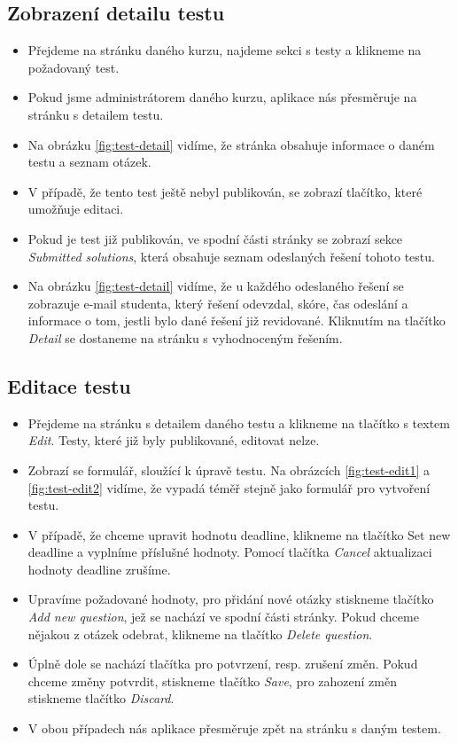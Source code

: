 \subsection{Zobrazení detailu testu}
\begin{itemize}
	\item Přejdeme na stránku daného kurzu, najdeme sekci s testy a klikneme na požadovaný test.
	\item Pokud jsme administrátorem daného kurzu, aplikace nás přesměruje na stránku s detailem testu.
	\item Na obrázku \ref{fig:test-detail} vidíme, že stránka obsahuje informace o daném testu a seznam otázek.
	\item V případě, že tento test ještě nebyl publikován, se zobrazí tlačítko, které umožňuje editaci.
	\item Pokud je test již publikován, ve spodní části stránky se zobrazí sekce \textit{Submitted solutions}, která obsahuje seznam odeslaných řešení tohoto testu.
	\item Na obrázku \ref{fig:test-detail} vidíme, že u každého odeslaného řešení se zobrazuje e-mail studenta, který řešení odevzdal, skóre, čas odeslání a informace o tom, jestli bylo dané řešení již revidované. Kliknutím na tlačítko \textit{Detail} se dostaneme na stránku s vyhodnoceným řešením.
\end{itemize}

\subsection{Editace testu}
\begin{itemize}
	\item Přejdeme na stránku s detailem daného testu a klikneme na tlačítko s textem \textit{Edit}. Testy, které již byly publikované, editovat nelze.
	\item Zobrazí se formulář, sloužící k úpravě testu. Na obrázcích \ref{fig:test-edit1} a \ref{fig:test-edit2} vidíme, že vypadá téměř stejně jako formulář pro vytvoření testu.
	\item V případě, že chceme upravit hodnotu deadline, klikneme na tlačítko Set new deadline a vyplníme příslušné hodnoty. Pomocí tlačítka \textit{Cancel} aktualizaci hodnoty deadline zrušíme.
	\item Upravíme požadované hodnoty, pro přidání nové otázky stiskneme tlačítko \textit{Add new question}, jež se nachází ve spodní části stránky. Pokud chceme nějakou z otázek odebrat, klikneme na tlačítko \textit{Delete question}.
	\item Úplně dole se nachází tlačítka pro potvrzení, resp. zrušení změn. Pokud chceme změny potvrdit, stiskneme tlačítko \textit{Save}, pro zahození změn stiskneme tlačítko \textit{Discard}.
	\item V obou případech nás aplikace přesměruje zpět na stránku s daným testem.
\end{itemize}

